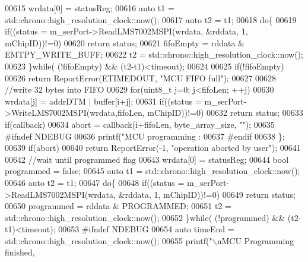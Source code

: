 \begin{DoxyCode}
{{00615         wrdata[0] = statusReg;
00616         \textcolor{keyword}{auto} t1 = std::chrono::high\_resolution\_clock::now();
00617         \textcolor{keyword}{auto} t2 = t1;
00618         \textcolor{keywordflow}{do}\{
00619             \textcolor{keywordflow}{if}((status = m\_serPort->ReadLMS7002MSPI(wrdata, &rddata, 1, mChipID))!=0)
00620                 \textcolor{keywordflow}{return} status;
00621             fifoEmpty = rddata & EMTPY\_WRITE\_BUFF;
00622             t2 = std::chrono::high\_resolution\_clock::now();
00623         \}\textcolor{keywordflow}{while}( (!fifoEmpty) && (t2-t1)<timeout);
00624 
00625         \textcolor{keywordflow}{if}(!fifoEmpty)
00626             \textcolor{keywordflow}{return} ReportError(ETIMEDOUT, \textcolor{stringliteral}{"MCU FIFO full"});
00627 
00628         \textcolor{comment}{//write 32 bytes into FIFO}
00629         \textcolor{keywordflow}{for}(uint8\_t j=0; j<fifoLen; ++j)
00630             wrdata[j] = addrDTM | buffer[i+j];
00631         \textcolor{keywordflow}{if}((status = m\_serPort->WriteLMS7002MSPI(wrdata,fifoLen, mChipID))!=0)
00632             \textcolor{keywordflow}{return} status;
00633         \textcolor{keywordflow}{if}(callback)
00634             abort = callback(i+fifoLen, byte\_array\_size, \textcolor{stringliteral}{""});
00635 \textcolor{preprocessor}{#ifndef NDEBUG}
00636         printf(\textcolor{stringliteral}{"MCU programming : %
00637 \textcolor{preprocessor}{#endif}
00638     \};
00639     \textcolor{keywordflow}{if}(abort)
00640         \textcolor{keywordflow}{return} ReportError(-1, \textcolor{stringliteral}{"operation aborted by user"});
00641 
00642     \textcolor{comment}{//wait until programmed flag}
00643     wrdata[0] = statusReg;
00644     \textcolor{keywordtype}{bool} programmed = \textcolor{keyword}{false};
00645     \textcolor{keyword}{auto} t1 = std::chrono::high\_resolution\_clock::now();
00646     \textcolor{keyword}{auto} t2 = t1;
00647     \textcolor{keywordflow}{do}\{
00648         \textcolor{keywordflow}{if}((status = m\_serPort->ReadLMS7002MSPI(wrdata, &rddata, 1, mChipID))!=0)
00649             \textcolor{keywordflow}{return} status;
00650         programmed = rddata & PROGRAMMED;
00651         t2 = std::chrono::high\_resolution\_clock::now();
00652     \}\textcolor{keywordflow}{while}( (!programmed) && (t2-t1)<timeout);
00653 \textcolor{preprocessor}{#ifndef NDEBUG}
00654     \textcolor{keyword}{auto} timeEnd = std::chrono::high\_resolution\_clock::now();
00655     printf(\textcolor{stringliteral}{"\(\backslash\)nMCU Programming finished, %
}}}}
\end{DoxyCode}
